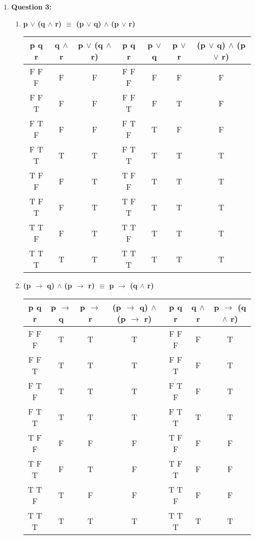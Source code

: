 \documentclass[11pt]{article}
\begin{document}
\begin{enumerate}
\item
\textbf{Question 3:} %
\begin{enumerate}[label=(\alph*)]
\item %
\textbf{p $\lor$ (q $\land$ r) $\equiv$ (p $\lor$ q) $\land$ (p $\lor$ r)} \\
    \begin{tabular}{c|c|c||c|c|c|c}
        \textbf{p q r} & \textbf{q $\land$ r} & \textbf{p $\lor$ (q $\land$ r)} & \textbf{p q r} & \textbf{p $\lor$ q} & \textbf{p $\lor$ r} & \textbf{(p $\lor$ q) $\land$ (p $\lor$ r)} \\
        \hline
        F F F & F & F & F F F & F & F & F \\
        F F T & F & F & F F T & F & T & F \\
        \hline
        F T F & F & F & F T F & T & F & F \\
        F T T & T & T & F T T & T & T & T \\
        \hline
        T F F & F & T & T F F & T & T & T \\
        T F T & F & T & T F T & T & T & T \\
        \hline
        T T F & F & T & T T F & T & T & T \\
        T T T & T & T & T T T & T & T & T \\
    \end{tabular}

\item %
\textbf{(p $\to$ q) $\land$ (p $\to$ r) $\equiv$ p $\to$ (q $\land$ r)} \\
    \begin{tabular}{c|c|c|c||c|c|c}
        \textbf{p q r} & \textbf{p $\to$ q} & \textbf{p $\to$ r} & \textbf{(p $\to$ q) $\land$ (p $\to$ r)} & \textbf{p q r} & \textbf{q $\land$ r} & \textbf{p $\to$ (q $\land$ r)} \\
        \hline
        F F F & T & T & T & F F F & F & T \\
        F F T & T & T & T & F F T & F & T \\
        \hline
        F T F & T & T & T & F T F & F & T \\
        F T T & T & T & T & F T T & T & T \\
        \hline
        T F F & F & F & F & T F F & F & F \\
        T F T & F & T & F & T F T & F & F \\
        \hline
        T T F & T & F & F & T T F & F & F \\
        T T T & T & T & T & T T T & T & T \\
    \end{tabular}
\end{enumerate}


\end{enumerate}
\end{document}
